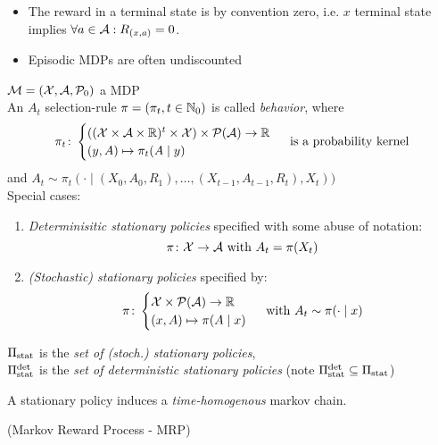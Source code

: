 \begin{remark}\leavevmode
	\begin{itemize}
		\item The reward in a terminal state is by convention zero, i.e. \(x\) terminal state implies \(\forall a\in\mathcal{A}: R_{(x,a)}=0\).
		\item Episodic MDPs are often undiscounted
	\end{itemize}	
\end{remark}
\begin{definition}\(\mathcal{M}=(\mathcal{X},\mathcal{A},\mathcal{P}_0)\) a MDP\\
	 An \(A_t\) selection-rule \(\pi=(\pi_t,t\in\mathbb{N}_0)\) is called \emph{behavior}, where
	 \[ 
	 	\pi_t\colon
	 	\begin{cases}
	 		((\mathcal{X}\times\mathcal{A}\times\mathbb{R})^t\times\mathcal{X})\times\mathcal{P}(\mathcal{A}) \to \mathbb{R} \\
	 		(y,A)\mapsto \pi_t(A\mid y)
	 	\end{cases} \text{ is a probability kernel}
	 \]
	 and \(A_t\sim \pi_t(\cdot\mid (X_0,A_0,R_1), \dots,(X_{t-1},A_{t-1},R_t),X_t))\)\\
	 Special cases:
	 \begin{enumerate}
	 	\item \emph{Determinisitic stationary policies} specified with some abuse of notation:
	 	\[\leavevmode \pi\colon\cX\to\cA \text{ with }A_t=\pi(X_t)\]
	 	\item \emph{(Stochastic) stationary policies} specified by:
	 	\[\pi\colon \begin{cases}
	 	\mathcal{X}\times\mathcal{P}(\mathcal{A})\to\mathbb{R}\\
	 	(x,A)\mapsto \pi(A\mid x)
	 	\end{cases} \text{ with } A_t\sim\pi(\cdot\mid x)
	 	\]
	 \end{enumerate}
	 \(\Pi_{\textnormal{stat}}\) is the \emph{set of (stoch.) stationary policies}, \\ 
	 \(\Pi_{\textnormal{stat}}^{\textnormal{det}}\) is the \emph{set of deterministic stationary policies} (note \(\Pi_{\textnormal{stat}}^{\textnormal{det}}\subseteq\Pi_{\textnormal{stat}} \))
\end{definition}
\begin{remark}
A stationary policy induces a \emph{time-homogenous} markov chain.
\end{remark}
\begin{definition}(Markov Reward Process - MRP)
\end{definition}

